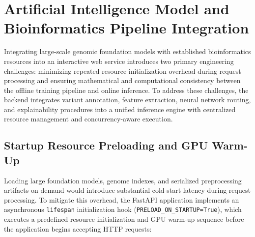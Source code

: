\section{Artificial Intelligence Model and Bioinformatics Pipeline Integration}
\label{sec:ai_pipeline_integration}

Integrating large-scale genomic foundation models with established bioinformatics resources into an interactive web service introduces two primary engineering challenges: minimizing repeated resource initialization overhead during request processing and ensuring mathematical and computational consistency between the offline training pipeline and online inference. To address these challenges, the backend integrates variant annotation, feature extraction, neural network routing, and explainability procedures into a unified inference engine with centralized resource management and concurrency-aware execution.

\subsection{Startup Resource Preloading and GPU Warm-Up}

Loading large foundation models, genome indexes, and serialized preprocessing artifacts on demand would introduce substantial cold-start latency during request processing. To mitigate this overhead, the FastAPI application implements an asynchronous \texttt{lifespan} initialization hook (\texttt{PRELOAD\_ON\_STARTUP=True}), which executes a predefined resource initialization and GPU warm-up sequence before the application begins accepting HTTP requests:

